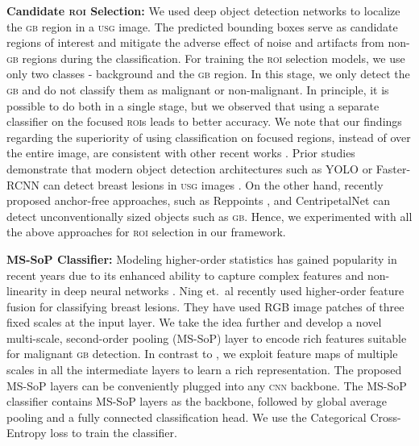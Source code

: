 \documentclass[10pt,twocolumn,letterpaper]{article}
\def\etal{{et.~al}}
\def\cnn{\textsc{cnn}\xspace}
\def\usg{\textsc{usg}\xspace}
\def\gb{\textsc{gb}\xspace}
\def\roi{\textsc{roi}\xspace}
\def\rois{\textsc{roi}s\xspace}
\newcommand{\myfirstpara}[1]{\noindent \textbf{#1:}}
\newcommand{\mypara}[1]{\vspace{0.1em} \myfirstpara{#1}}
\begin{document}
\mypara{Candidate \roi Selection}
We used deep object detection networks to localize the \gb region in a \usg image. The predicted bounding boxes serve as candidate regions of interest and mitigate the adverse effect of noise and artifacts from non-\gb regions during the classification. For training the \roi selection models, we use only two classes - background and the \gb region. In this stage, we only detect the \gb and do not classify them as malignant or non-malignant. In principle, it is possible to do both in a single stage, but we observed 
that using a separate classifier on the focused \rois leads to better accuracy. We note that our findings regarding the superiority of using classification on focused regions, instead of over the entire image, are consistent with other recent works \cite{sirinukunwattana2016locality, cao2019BreastLesion, lancet_pancreas, fan2020inf, eccv2020_devil_in_classification}. Prior studies demonstrate that modern object detection architectures such as YOLO \cite{yolov4} or Faster-RCNN \cite{fasterrcnn} can detect breast lesions in \usg images  \cite{cao2019BreastLesion}. On the other hand, recently proposed anchor-free approaches, such as Reppoints \cite{reppoints}, and CentripetalNet \cite{centripetalnet} can detect unconventionally sized objects such as \gb. Hence, we experimented with all the above approaches for \roi selection in our framework. 

\mypara{MS-SoP Classifier}
Modeling higher-order statistics has gained popularity in recent years due to its enhanced ability to capture complex features and non-linearity in deep neural networks \cite{zoumpourlis2017non, li2017second, gao2019global}. Ning \etal \cite{ning2020multi} recently used higher-order feature fusion for classifying breast lesions. They have used RGB image patches of three fixed scales at the input layer. We take the idea further and develop a novel multi-scale, second-order pooling (MS-SoP) layer to encode rich features suitable for malignant \gb detection. In contrast to \cite{ning2020multi}, we exploit feature maps of multiple scales in all the intermediate layers to learn a rich representation. The proposed MS-SoP layers can be conveniently plugged into any \cnn backbone.
The MS-SoP classifier contains  MS-SoP layers as the backbone, followed by global average pooling and a fully connected classification head. 
We use the Categorical Cross-Entropy loss to train the classifier. 
\end{document}
